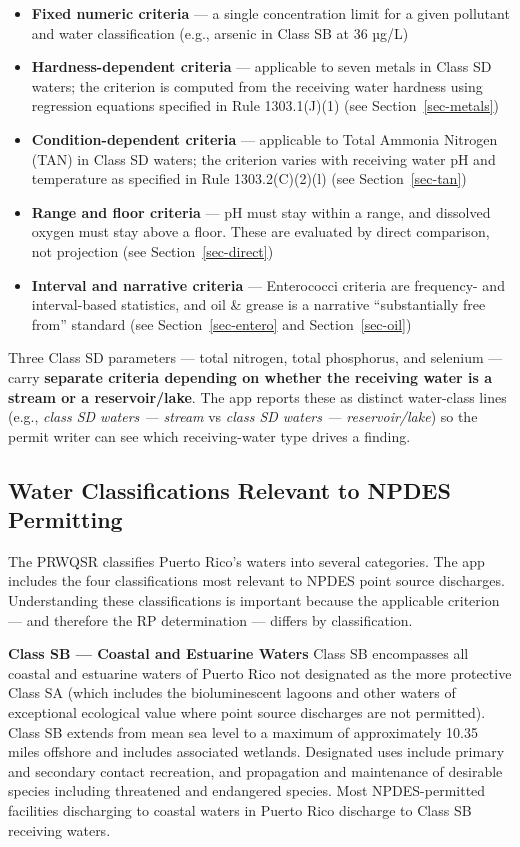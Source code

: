 \documentclass[
  11pt,
  letterpaper,
  DIV=11,
  numbers=noendperiod]{scrartcl}
\providecommand{\tightlist}{%
  \setlength{\itemsep}{0pt}\setlength{\parskip}{0pt}}
\begin{document}
\begin{itemize}
\tightlist
\item
  \textbf{Fixed numeric criteria} --- a single concentration limit for a
  given pollutant and water classification (e.g., arsenic in Class SB at
  36 µg/L)
\item
  \textbf{Hardness-dependent criteria} --- applicable to seven metals in
  Class SD waters; the criterion is computed from the receiving water
  hardness using regression equations specified in Rule 1303.1(J)(1)
  (see Section~\ref{sec-metals})
\item
  \textbf{Condition-dependent criteria} --- applicable to Total Ammonia
  Nitrogen (TAN) in Class SD waters; the criterion varies with receiving
  water pH and temperature as specified in Rule 1303.2(C)(2)(l) (see
  Section~\ref{sec-tan})
\item
  \textbf{Range and floor criteria} --- pH must stay within a range, and
  dissolved oxygen must stay above a floor. These are evaluated by
  direct comparison, not projection (see Section~\ref{sec-direct})
\item
  \textbf{Interval and narrative criteria} --- Enterococci criteria are
  frequency- and interval-based statistics, and oil \& grease is a
  narrative ``substantially free from'' standard (see
  Section~\ref{sec-entero} and Section~\ref{sec-oil})
\end{itemize}

Three Class SD parameters --- total nitrogen, total phosphorus, and
selenium --- carry \textbf{separate criteria depending on whether the
receiving water is a stream or a reservoir/lake}. The app reports these
as distinct water-class lines (e.g., \emph{class SD waters --- stream}
vs \emph{class SD waters --- reservoir/lake}) so the permit writer can
see which receiving-water type drives a finding.

\subsection{Water Classifications Relevant to NPDES
Permitting}\label{sec-classifications}

The PRWQSR classifies Puerto Rico's waters into several categories. The
app includes the four classifications most relevant to NPDES point
source discharges. Understanding these classifications is important
because the applicable criterion --- and therefore the RP determination
--- differs by classification.

\textbf{Class SB --- Coastal and Estuarine Waters} Class SB encompasses
all coastal and estuarine waters of Puerto Rico not designated as the
more protective Class SA (which includes the bioluminescent lagoons and
other waters of exceptional ecological value where point source
discharges are not permitted). Class SB extends from mean sea level to a
maximum of approximately 10.35 miles offshore and includes associated
wetlands. Designated uses include primary and secondary contact
recreation, and propagation and maintenance of desirable species
including threatened and endangered species. Most NPDES-permitted
facilities discharging to coastal waters in Puerto Rico discharge to
Class SB receiving waters.
\end{document}
